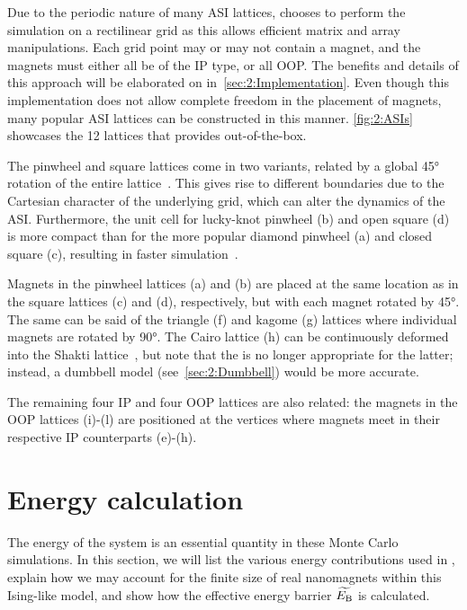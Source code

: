 Due to the periodic nature of many ASI lattices, \hotspice chooses to perform the simulation on a rectilinear grid as this allows efficient matrix and array manipulations.
Each grid point may or may not contain a magnet, and the magnets must either all be of the IP type, or all OOP.
The benefits and details of this approach will be elaborated on in~\cref{sec:2:Implementation}.
Even though this implementation does not allow complete freedom in the placement of magnets, many popular ASI lattices can be constructed in this manner.
\cref{fig:2:ASIs} showcases the 12 lattices that \hotspice provides out-of-the-box. \par
The pinwheel and square lattices come in two variants, related by a global \ang{45} rotation of the entire lattice~\cite{ApparentFMpinwheel}.
This gives rise to different boundaries due to the Cartesian character of the underlying grid, which can alter the dynamics of the ASI.
Furthermore, the unit cell for lucky-knot pinwheel (b) and open square (d) is more compact than for the more popular diamond pinwheel (a) and closed square (c), resulting in faster simulation~\cite{AdvancesASI}. \par %
Magnets in the pinwheel lattices (a) and (b) are placed at the same location as in the square lattices (c) and (d), respectively, but with each magnet rotated by \ang{45}.
The same can be said of the triangle (f) and kagome (g) lattices where individual magnets are rotated by \ang{90}.
The Cairo lattice (h) can be continuously deformed into the Shakti lattice~\cite{ShaktiCairo,ShaktiCairoSquare}, but note that the  is no longer appropriate for the latter; instead, a dumbbell model (see~\cref{sec:2:Dumbbell}) would be more accurate. \par
The remaining four IP and four OOP lattices are also related: the magnets in the OOP lattices (i)-(l) are positioned at the vertices where magnets meet in their respective IP counterparts (e)-(h).

\section{Energy calculation}
The energy of the system is an essential quantity in these Monte Carlo simulations.
In this section, we will list the various energy contributions used in \hotspice, explain how we may account for the finite size of real nanomagnets within this Ising-like model, and show how the effective energy barrier $\widetilde{E_\mathrm{B}}$ is calculated.


